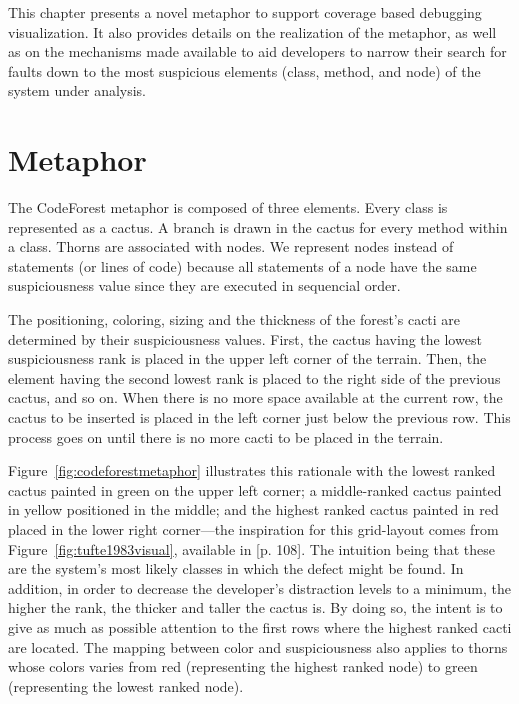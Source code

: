 This chapter presents a novel metaphor  to support coverage based debugging
visualization. It also provides details on  the realization of the metaphor, as
well as on the mechanisms made available to aid developers to narrow their
search for faults down to the most suspicious elements (class, method, and node)
of the system under analysis.

\section{Metaphor}\label{sec:metaphor}
The CodeForest metaphor is composed of three elements. Every class is
represented as a cactus. A branch is drawn in the cactus for every method within
a class. Thorns are associated with nodes. We represent nodes instead of
statements (or lines of code) because all statements of a node have the same
suspiciousness value since they are executed in sequencial order.

The positioning, coloring, sizing and the thickness of the forest's cacti are
determined  by their suspiciousness values. First, the cactus having the lowest
suspiciousness rank is placed in the upper left corner of the terrain.
Then, the element having the second lowest rank is placed to the right side of
the previous cactus, and so on. When there is no more space available at the
current row, the cactus to be inserted is placed in the left corner just below
the previous row. This process goes on until there is no more cacti to be placed
in the terrain.

Figure~\ref{fig:codeforestmetaphor} illustrates this rationale with the lowest
ranked cactus  painted in green on the upper left corner; a middle-ranked cactus
painted in yellow  positioned in the middle; and the highest ranked cactus
painted in red placed in the lower right corner---the inspiration for this
grid-layout comes from Figure~\ref{fig:tufte1983visual}, available in
\cite{tufte1983visual}[p. 108].
The intuition being that these are the system's most likely classes in which the
defect might be found.
In addition, in order to decrease the developer's distraction levels to a
minimum, the higher the rank, the thicker and taller the cactus is. By doing so,
the intent is to give as much as possible attention to the first rows where the
highest ranked cacti are located.
The mapping between color and suspiciousness also applies to thorns whose colors
varies from red (representing the highest ranked node) to green (representing
the lowest ranked node).

